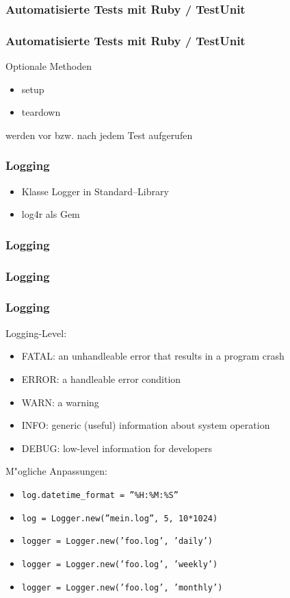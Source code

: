 \documentclass{beamer}
\begin{document}
\begin{frame}[containsverbatim]
  \frametitle{Automatisierte Tests mit Ruby / TestUnit}
  
\end{frame}

\begin{frame}
  \frametitle{Automatisierte Tests mit Ruby / TestUnit}
Optionale Methoden 
\begin{itemize}
  \item setup
  \item teardown
\end{itemize}
werden vor bzw. nach jedem Test aufgerufen
\end{frame}

\begin{frame}
  \frametitle{Logging}
  \begin{itemize}
    \item Klasse Logger in Standard--Library
    \item log4r als Gem
  \end{itemize}
\end{frame}

\begin{frame}
  \frametitle{Logging}
  
\end{frame}

\begin{frame}
  \frametitle{Logging}
  
\end{frame}

\begin{frame}
  \frametitle{Logging}
  Logging-Level:
  \begin{itemize}
    \item FATAL: an unhandleable error that results in a program crash
    \item ERROR: a handleable error condition
    \item WARN:	a warning
    \item INFO:	generic (useful) information about system operation
    \item DEBUG: low-level information for developers 
  \end{itemize}

  M"ogliche Anpassungen:
  \begin{itemize}
    \item \texttt{log.datetime\_format = ''\%H:\%M:\%S''}
    \item \texttt{log = Logger.new(''mein.log'', 5, 10*1024)}
    \item \texttt{logger = Logger.new('foo.log', 'daily')}
    \item \texttt{logger = Logger.new('foo.log', 'weekly')}
    \item \texttt{logger = Logger.new('foo.log', 'monthly')}
 
  \end{itemize}
\end{frame}
\end{document}
